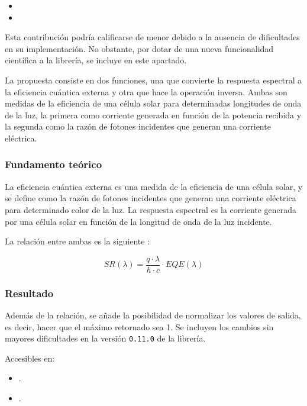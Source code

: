 \begin{itemize}
    \item {}
    \item {}
\end{itemize}

Esta contribución podría calificarse de menor debido a la ausencia de dificultades en su implementación. No obstante, por dotar de una nueva funcionalidad científica a la librería, se incluye en este apartado.

La propuesta consiste en dos funciones, una que convierte la respuesta espectral a la eficiencia cuántica externa y otra que hace la operación inversa. Ambas son medidas de la eficiencia de una célula solar para determinadas longitudes de onda de la luz, la primera como corriente generada en función de la potencia recibida y la segunda como la razón de fotones incidentes que generan una corriente eléctrica.

\subsubsection{Fundamento teórico}

La eficiencia cuántica externa es una medida de la eficiencia de una célula solar, y se define como la razón de fotones incidentes que generan una corriente eléctrica para determinado color de la luz. La respuesta espectral es la corriente generada por una célula solar en función de la longitud de onda de la luz incidente.

La relación entre ambas es la siguiente \cite[pp. 15-16, Eq. ]{Markvart2012-un}:

\begin{equation}
    SR(\lambda) = \frac{q \cdot \lambda}{h \cdot c} \cdot EQE(\lambda)
\end{equation}

\subsubsection{Resultado}

Además de la relación, se añade la posibilidad de normalizar los valores de salida, es decir, hacer que el máximo retornado sea 1. Se incluyen los cambios sin mayores dificultades en la versión \texttt{0.11.0} de la librería.

Accesibles en:

\begin{itemize}
    \item {}.
    \item {}.
\end{itemize}

